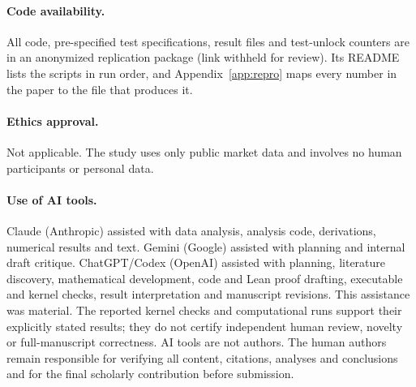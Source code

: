 \documentclass[12pt]{article}
\theoremstyle{definition}
\theoremstyle{remark}
\begin{document}
\paragraph{Code availability.} All code, pre-specified test specifications, result files and test-unlock counters are in an anonymized replication package (link withheld for review). Its README lists the scripts in run order, and Appendix~\ref{app:repro} maps every number in the paper to the file that produces it.

\paragraph{Ethics approval.} Not applicable. The study uses only public market data and involves no human participants or personal data.

\paragraph{Use of AI tools.} Claude (Anthropic) assisted with data analysis, analysis code, derivations, numerical results and text. Gemini (Google) assisted with planning and internal draft critique. ChatGPT/Codex (OpenAI) assisted with planning, literature discovery, mathematical development, code and Lean proof drafting, executable and kernel checks, result interpretation and manuscript revisions. This assistance was material. The reported kernel checks and computational runs support their explicitly stated results; they do not certify independent human review, novelty or full-manuscript correctness. AI tools are not authors. The human authors remain responsible for verifying all content, citations, analyses and conclusions and for the final scholarly contribution before submission.
\end{document}
